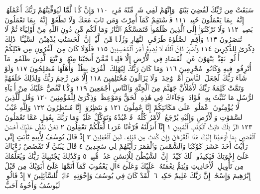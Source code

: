 سَبَقَتْ مِن رَّبِّكَ لَقُضِيَ بَيْنَهُمْۚ وَإِنَّهُمْ لَفِي شَكࣲّ مِّنْهُ مُرِيبࣲ ١١٠
وَإِنَّ كُلࣰّا لَّمَّا لَيُوَفِّيَنَّهُمْ رَبُّكَ أَعْمَٰلَهُمْۚ إِنَّهُۥ بِمَا يَعْمَلُونَ
خَبِيرࣱ ١١١ فَٱسْتَقِمْ كَمَآ أُمِرْتَ وَمَن تَابَ مَعَكَ وَلَا تَطْغَوْا۟ۚ
إِنَّهُۥ بِمَا تَعْمَلُونَ بَصِيرࣱ ١١٢ وَلَا تَرْكَنُوٓا۟ إِلَى ٱلَّذِينَ ظَلَمُوا۟
فَتَمَسَّكُمُ ٱلنَّارُ وَمَا لَكُم مِّن دُونِ ٱللَّهِ مِنْ أَوْلِيَآءَ ثُمَّ
لَا تُنصَرُونَ ١١٣ وَأَقِمِ ٱلصَّلَوٰةَ طَرَفَيِ ٱلنَّهَارِ وَزُلَفࣰا مِّنَ
ٱلَّيْلِۚ إِنَّ ٱلْحَسَنَٰتِ يُذْهِبْنَ ٱلسَّيِّـَٔاتِۚ ذَٰلِكَ ذِكْرَىٰ
لِلذَّٰكِرِينَ ١١٤ وَٱصْبِرْ فَإِنَّ ٱللَّهَ لَا يُضِيعُ أَجْرَ ٱلْمُحْسِنِينَ ١١٥
فَلَوْلَا كَانَ مِنَ ٱلْقُرُونِ مِن قَبْلِكُمْ أُو۟لُوا۟ بَقِيَّةࣲ يَنْهَوْنَ
عَنِ ٱلْفَسَادِ فِي ٱلْأَرْضِ إِلَّا قَلِيلࣰا مِّمَّنْ أَنجَيْنَا مِنْهُمْۗ وَٱتَّبَعَ
ٱلَّذِينَ ظَلَمُوا۟ مَآ أُتْرِفُوا۟ فِيهِ وَكَانُوا۟ مُجْرِمِينَ ١١٦ وَمَا
كَانَ رَبُّكَ لِيُهْلِكَ ٱلْقُرَىٰ بِظُلْمࣲ وَأَهْلُهَا مُصْلِحُونَ ١١٧
وَلَوْ شَآءَ رَبُّكَ لَجَعَلَ ٱلنَّاسَ أُمَّةࣰ وَٰحِدَةࣰۖ وَلَا يَزَالُونَ مُخْتَلِفِينَ ١١٨
إِلَّا مَن رَّحِمَ رَبُّكَۚ وَلِذَٰلِكَ خَلَقَهُمْۗ وَتَمَّتْ كَلِمَةُ رَبِّكَ
لَأَمْلَأَنَّ جَهَنَّمَ مِنَ ٱلْجِنَّةِ وَٱلنَّاسِ أَجْمَعِينَ ١١٩ وَكُلࣰّا نَّقُصُّ
عَلَيْكَ مِنْ أَنۢبَآءِ ٱلرُّسُلِ مَا نُثَبِّتُ بِهِۦ فُؤَادَكَۚ وَجَآءَكَ فِي هَٰذِهِ
ٱلْحَقُّ وَمَوْعِظَةࣱ وَذِكْرَىٰ لِلْمُؤْمِنِينَ ١٢٠ وَقُل لِّلَّذِينَ لَا يُؤْمِنُونَ
ٱعْمَلُوا۟ عَلَىٰ مَكَانَتِكُمْ إِنَّا عَٰمِلُونَ ١٢١ وَٱنتَظِرُوٓا۟ إِنَّا مُنتَظِرُونَ ١٢٢
وَلِلَّهِ غَيْبُ ٱلسَّمَٰوَٰتِ وَٱلْأَرْضِ وَإِلَيْهِ يُرْجَعُ ٱلْأَمْرُ كُلُّهُۥ
فَٱعْبُدْهُ وَتَوَكَّلْ عَلَيْهِۚ وَمَا رَبُّكَ بِغَٰفِلٍ عَمَّا تَعْمَلُونَ ١٢٣
الٓرۚ تِلْكَ ءَايَٰتُ ٱلْكِتَٰبِ ٱلْمُبِينِ ١ إِنَّآ أَنزَلْنَٰهُ قُرْءَٰنًا
عَرَبِيࣰّا لَّعَلَّكُمْ تَعْقِلُونَ ٢ نَحْنُ نَقُصُّ عَلَيْكَ أَحْسَنَ
ٱلْقَصَصِ بِمَآ أَوْحَيْنَآ إِلَيْكَ هَٰذَا ٱلْقُرْءَانَ وَإِن كُنتَ مِن قَبْلِهِۦ
لَمِنَ ٱلْغَٰفِلِينَ ٣ إِذْ قَالَ يُوسُفُ لِأَبِيهِ يَٰٓأَبَتِ إِنِّي رَأَيْتُ
أَحَدَ عَشَرَ كَوْكَبࣰا وَٱلشَّمْسَ وَٱلْقَمَرَ رَأَيْتُهُمْ لِي سَٰجِدِينَ ٤
قَالَ يَٰبُنَيَّ لَا تَقْصُصْ رُءْيَاكَ عَلَىٰٓ إِخْوَتِكَ فَيَكِيدُوا۟ لَكَ كَيْدًاۖ
إِنَّ ٱلشَّيْطَٰنَ لِلْإِنسَٰنِ عَدُوࣱّ مُّبِينࣱ ٥ وَكَذَٰلِكَ يَجْتَبِيكَ
رَبُّكَ وَيُعَلِّمُكَ مِن تَأْوِيلِ ٱلْأَحَادِيثِ وَيُتِمُّ نِعْمَتَهُۥ عَلَيْكَ
وَعَلَىٰٓ ءَالِ يَعْقُوبَ كَمَآ أَتَمَّهَا عَلَىٰٓ أَبَوَيْكَ مِن قَبْلُ إِبْرَٰهِيمَ
وَإِسْحَٰقَۚ إِنَّ رَبَّكَ عَلِيمٌ حَكِيمࣱ ٦۞ لَّقَدْ كَانَ فِي يُوسُفَ
وَإِخْوَتِهِۦٓ ءَايَٰتࣱ لِّلسَّآئِلِينَ ٧ إِذْ قَالُوا۟ لَيُوسُفُ وَأَخُوهُ أَحَبُّ

